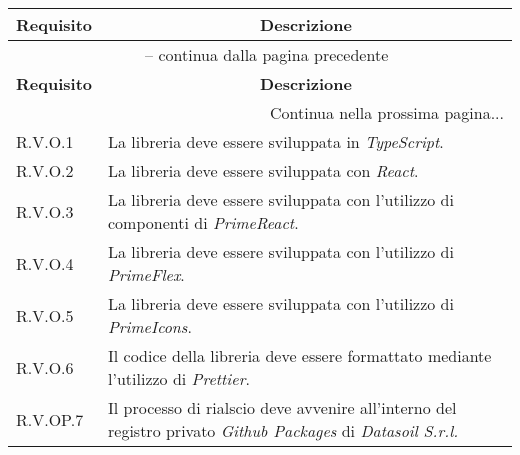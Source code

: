 \begin{center}
    \begin{longtable}{|p{2.5cm}|p{10cm}|}
        \hline
        \rowcolor{gray!30}
        \textbf{Requisito} & \multicolumn{1}{c|}{\textbf{Descrizione}}                                                                                   \\
        \hline
        \endfirsthead
        \hline
        \multicolumn{2}{|c|}{{\tablename\ \thetable{} -- continua dalla pagina precedente}}                                                              \\
        \hline
        \rowcolor{gray!30}
        \textbf{Requisito} & \multicolumn{1}{c|}{\textbf{Descrizione}}                                                                                   \\
        \endhead
        \hline
        \multicolumn{2}{|r|}{{Continua nella prossima pagina...}}                                                                                        \\
        \hline
        \endfoot
        \hline
        \endlastfoot
        \hline
        R.V.O.1            & La libreria deve essere sviluppata in \textit{TypeScript}.                                                                  \\
        \hline
        R.V.O.2            & La libreria deve essere sviluppata con \textit{React}.                                                                      \\
        \hline
        R.V.O.3            & La libreria deve essere sviluppata con l'utilizzo di componenti di \textit{PrimeReact}.                                     \\
        \hline
        R.V.O.4            & La libreria deve essere sviluppata con l'utilizzo di \textit{PrimeFlex}.                                                    \\
        \hline
        R.V.O.5            & La libreria deve essere sviluppata con l'utilizzo di \textit{PrimeIcons}.                                                   \\
        \hline
        R.V.O.6            & Il codice della libreria deve essere formattato mediante l'utilizzo di \textit{Prettier}.                                   \\
        \hline
        R.V.OP.7           & Il processo di rialscio deve avvenire all'interno del registro privato \textit{Github Packages} di \textit{Datasoil S.r.l.} \\
    \end{longtable}
    \label{tab:requisiti_vincolo}
\end{center}
